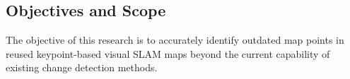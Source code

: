 \subsection{Objectives and Scope}
\label{objectives}

The objective of this research is to accurately identify outdated map points in reused keypoint-based visual SLAM maps beyond the current capability of existing change detection methods. 